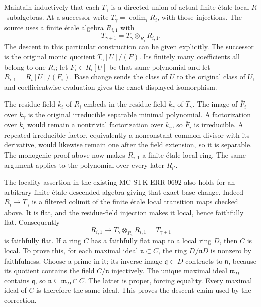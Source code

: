 Maintain inductively that each \(T_\gamma\) is a directed union of actual finite étale local \(R\)-subalgebras. At a successor write \(T_\gamma=\operatorname*{colim}_i R_i\), with those injections. The source uses a finite étale algebra \(R_{i,1}\) with \[
 T_{\gamma+1}=T_\gamma\otimes_{R_i}R_{i,1}.
\] The descent in this particular construction can be given explicitly. The successor is the original monic quotient \(T_\gamma[U]/(F)\). Its finitely many coefficients all belong to one \(R_i\); let \(F_i\in R_i[U]\) be that same polynomial and let \(R_{i,1}=R_i[U]/(F_i)\). Base change sends the class of \(U\) to the original class of \(U\), and coefficientwise evaluation gives the exact displayed isomorphism.

The residue field \(k_i\) of \(R_i\) embeds in the residue field \(k_\gamma\) of \(T_\gamma\). The image of \(\overline F_i\) over \(k_\gamma\) is the original irreducible separable minimal polynomial. A factorization over \(k_i\) would remain a nontrivial factorization over \(k_\gamma\), so \(\overline F_i\) is irreducible. A repeated irreducible factor, equivalently a nonconstant common divisor with its derivative, would likewise remain one after the field extension, so it is separable. The monogenic proof above now makes \(R_{i,1}\) a finite étale local ring. The same argument applies to the polynomial over every later \(R_{i'}\).

The locality assertion in the existing MC-\AlgebraIdentifierBreak{}STK-\AlgebraIdentifierBreak{}ERR-\AlgebraIdentifierBreak{}0692 also holds for an arbitrary finite étale descended algebra giving that exact base change. Indeed \(R_i\to T_\gamma\) is a filtered colimit of the finite étale local transition maps checked above. It is flat, and the residue-field injection makes it local, hence faithfully flat. Consequently \[
 R_{i,1}\longrightarrow T_\gamma\otimes_{R_i}R_{i,1}=T_{\gamma+1}
\] is faithfully flat. If a ring \(C\) has a faithfully flat map to a local ring \(D\), then \(C\) is local. To prove this, for each maximal ideal \(\mathfrak n\subset C\), the ring \(D/\mathfrak nD\) is nonzero by faithfulness. Choose a prime in it; its inverse image \(\mathfrak q\subset D\) contracts to \(\mathfrak n\), because its quotient contains the field \(C/\mathfrak n\) injectively. The unique maximal ideal \(\mathfrak m_D\) contains \(\mathfrak q\), so \(\mathfrak n\subseteq \mathfrak m_D\cap C\). The latter is proper, forcing equality. Every maximal ideal of \(C\) is therefore the same ideal. This proves the descent claim used by the correction.

